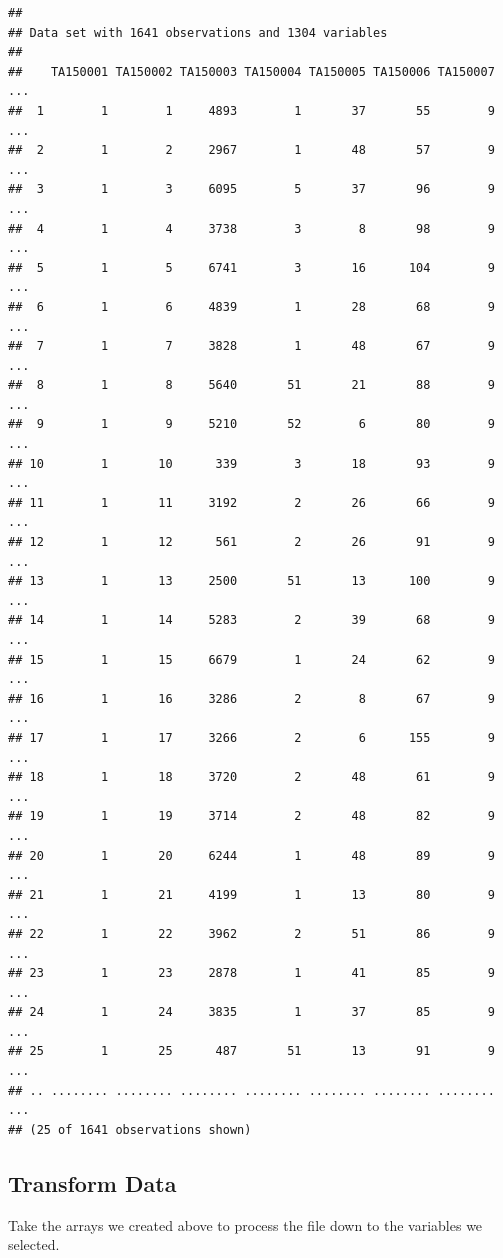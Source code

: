 \documentclass[]{book}
\theoremstyle{definition}
\theoremstyle{definition}
\theoremstyle{remark}
\begin{document}
\begin{verbatim}
## 
## Data set with 1641 observations and 1304 variables
## 
##    TA150001 TA150002 TA150003 TA150004 TA150005 TA150006 TA150007 ...
##  1        1        1     4893        1       37       55        9 ...
##  2        1        2     2967        1       48       57        9 ...
##  3        1        3     6095        5       37       96        9 ...
##  4        1        4     3738        3        8       98        9 ...
##  5        1        5     6741        3       16      104        9 ...
##  6        1        6     4839        1       28       68        9 ...
##  7        1        7     3828        1       48       67        9 ...
##  8        1        8     5640       51       21       88        9 ...
##  9        1        9     5210       52        6       80        9 ...
## 10        1       10      339        3       18       93        9 ...
## 11        1       11     3192        2       26       66        9 ...
## 12        1       12      561        2       26       91        9 ...
## 13        1       13     2500       51       13      100        9 ...
## 14        1       14     5283        2       39       68        9 ...
## 15        1       15     6679        1       24       62        9 ...
## 16        1       16     3286        2        8       67        9 ...
## 17        1       17     3266        2        6      155        9 ...
## 18        1       18     3720        2       48       61        9 ...
## 19        1       19     3714        2       48       82        9 ...
## 20        1       20     6244        1       48       89        9 ...
## 21        1       21     4199        1       13       80        9 ...
## 22        1       22     3962        2       51       86        9 ...
## 23        1       23     2878        1       41       85        9 ...
## 24        1       24     3835        1       37       85        9 ...
## 25        1       25      487       51       13       91        9 ...
## .. ........ ........ ........ ........ ........ ........ ........ ...
## (25 of 1641 observations shown)
\end{verbatim}

\subsection{Transform Data}\label{transform-data}

Take the arrays we created above to process the file down to the
variables we selected.
\end{document}

